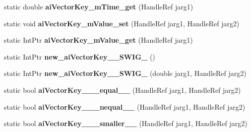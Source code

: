 \begin{DoxyCompactItemize}
\item 
\hypertarget{class_assimp_p_i_n_v_o_k_e_a6c484980d0b9a8042a755b69931e6e72}{static double {\bfseries ai\+Vector\+Key\+\_\+m\+Time\+\_\+get} (Handle\+Ref jarg1)}\label{class_assimp_p_i_n_v_o_k_e_a6c484980d0b9a8042a755b69931e6e72}

\item 
\hypertarget{class_assimp_p_i_n_v_o_k_e_ae7508ae8c687e5bbacb2eb0247c1d6db}{static void {\bfseries ai\+Vector\+Key\+\_\+m\+Value\+\_\+set} (Handle\+Ref jarg1, Handle\+Ref jarg2)}\label{class_assimp_p_i_n_v_o_k_e_ae7508ae8c687e5bbacb2eb0247c1d6db}

\item 
\hypertarget{class_assimp_p_i_n_v_o_k_e_a32dae8f8daed6b0ed631840b2cb53e37}{static Int\+Ptr {\bfseries ai\+Vector\+Key\+\_\+m\+Value\+\_\+get} (Handle\+Ref jarg1)}\label{class_assimp_p_i_n_v_o_k_e_a32dae8f8daed6b0ed631840b2cb53e37}

\item 
\hypertarget{class_assimp_p_i_n_v_o_k_e_a3c6831527b02a61e225573c12ae6f9b4}{static Int\+Ptr {\bfseries new\+\_\+ai\+Vector\+Key\+\_\+\+\_\+\+S\+W\+I\+G\+\_} ()}\label{class_assimp_p_i_n_v_o_k_e_a3c6831527b02a61e225573c12ae6f9b4}

\item 
\hypertarget{class_assimp_p_i_n_v_o_k_e_aa94f5b3eabbcb70a4fe188dd58a94806}{static Int\+Ptr {\bfseries new\+\_\+ai\+Vector\+Key\+\_\+\+\_\+\+S\+W\+I\+G\+\_} (double jarg1, Handle\+Ref jarg2)}\label{class_assimp_p_i_n_v_o_k_e_aa94f5b3eabbcb70a4fe188dd58a94806}

\item 
\hypertarget{class_assimp_p_i_n_v_o_k_e_af2c8f2918bcb86b56e157a9b6324e83d}{static bool {\bfseries ai\+Vector\+Key\+\_\+\+\_\+\+\_\+equal\+\_\+\+\_\+} (Handle\+Ref jarg1, Handle\+Ref jarg2)}\label{class_assimp_p_i_n_v_o_k_e_af2c8f2918bcb86b56e157a9b6324e83d}

\item 
\hypertarget{class_assimp_p_i_n_v_o_k_e_ae9055c117ceab7c1669188cc967b97ec}{static bool {\bfseries ai\+Vector\+Key\+\_\+\+\_\+\+\_\+nequal\+\_\+\+\_\+} (Handle\+Ref jarg1, Handle\+Ref jarg2)}\label{class_assimp_p_i_n_v_o_k_e_ae9055c117ceab7c1669188cc967b97ec}

\item 
\hypertarget{class_assimp_p_i_n_v_o_k_e_abf3f274694678d7d4652b34f5448c652}{static bool {\bfseries ai\+Vector\+Key\+\_\+\+\_\+\+\_\+smaller\+\_\+\+\_\+} (Handle\+Ref jarg1, Handle\+Ref jarg2)}\label{class_assimp_p_i_n_v_o_k_e_abf3f274694678d7d4652b34f5448c652}


\end{DoxyCompactItemize}
